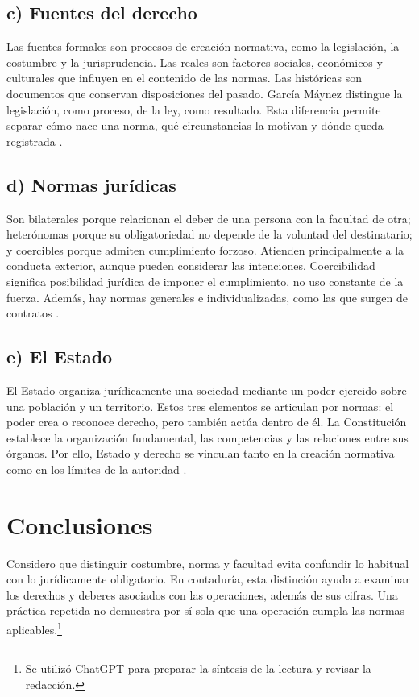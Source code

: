 {\subsection*{c) Fuentes del derecho}
Las fuentes formales son procesos de creación normativa, como la legislación, la costumbre y la jurisprudencia. Las reales son factores sociales, económicos y culturales que influyen en el contenido de las normas. Las históricas son documentos que conservan disposiciones del pasado. García Máynez distingue la legislación, como proceso, de la ley, como resultado. Esta diferencia permite separar cómo nace una norma, qué circunstancias la motivan y dónde queda registrada \parencite[51--52]{garciaMaynezLecturaS1}.

\clearpage
\subsection*{d) Normas jurídicas}
Son bilaterales porque relacionan el deber de una persona con la facultad de otra; heterónomas porque su obligatoriedad no depende de la voluntad del destinatario; y coercibles porque admiten cumplimiento forzoso. Atienden principalmente a la conducta exterior, aunque pueden considerar las intenciones. Coercibilidad significa posibilidad jurídica de imponer el cumplimiento, no uso constante de la fuerza. Además, hay normas generales e individualizadas, como las que surgen de contratos \parencite[15, 21--22, 82--83]{garciaMaynezLecturaS1}.

\subsection*{e) El Estado}
El Estado organiza jurídicamente una sociedad mediante un poder ejercido sobre una población y un territorio. Estos tres elementos se articulan por normas: el poder crea o reconoce derecho, pero también actúa dentro de él. La Constitución establece la organización fundamental, las competencias y las relaciones entre sus órganos. Por ello, Estado y derecho se vinculan tanto en la creación normativa como en los límites de la autoridad \parencite[97--98, 108]{garciaMaynezLecturaS1}.

\section{Conclusiones}
Considero que distinguir costumbre, norma y facultad evita confundir lo habitual con lo jurídicamente obligatorio. En contaduría, esta distinción ayuda a examinar los derechos y deberes asociados con las operaciones, además de sus cifras. Una práctica repetida no demuestra por sí sola que una operación cumpla las normas aplicables.\footnote{Se utilizó ChatGPT para preparar la síntesis de la lectura y revisar la redacción.}
}

